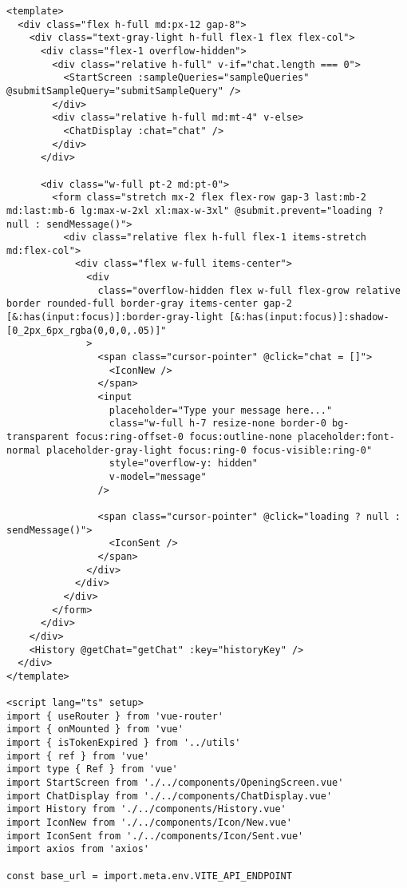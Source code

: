 \begin{Verbatim}[breaklines=true, breakanywhere=true]
<template>
  <div class="flex h-full md:px-12 gap-8">
    <div class="text-gray-light h-full flex-1 flex flex-col">
      <div class="flex-1 overflow-hidden">
        <div class="relative h-full" v-if="chat.length === 0">
          <StartScreen :sampleQueries="sampleQueries" @submitSampleQuery="submitSampleQuery" />
        </div>
        <div class="relative h-full md:mt-4" v-else>
          <ChatDisplay :chat="chat" />
        </div>
      </div>

      <div class="w-full pt-2 md:pt-0">
        <form class="stretch mx-2 flex flex-row gap-3 last:mb-2 md:last:mb-6 lg:max-w-2xl xl:max-w-3xl" @submit.prevent="loading ? null : sendMessage()">
          <div class="relative flex h-full flex-1 items-stretch md:flex-col">
            <div class="flex w-full items-center">
              <div
                class="overflow-hidden flex w-full flex-grow relative border rounded-full border-gray items-center gap-2 [&:has(input:focus)]:border-gray-light [&:has(input:focus)]:shadow-[0_2px_6px_rgba(0,0,0,.05)]"
              >
                <span class="cursor-pointer" @click="chat = []">
                  <IconNew />
                </span>
                <input
                  placeholder="Type your message here..."
                  class="w-full h-7 resize-none border-0 bg-transparent focus:ring-offset-0 focus:outline-none placeholder:font-normal placeholder-gray-light focus:ring-0 focus-visible:ring-0"
                  style="overflow-y: hidden"
                  v-model="message"
                />

                <span class="cursor-pointer" @click="loading ? null : sendMessage()">
                  <IconSent />
                </span>
              </div>
            </div>
          </div>
        </form>
      </div>
    </div>
    <History @getChat="getChat" :key="historyKey" />
  </div>
</template>

<script lang="ts" setup>
import { useRouter } from 'vue-router'
import { onMounted } from 'vue'
import { isTokenExpired } from '../utils'
import { ref } from 'vue'
import type { Ref } from 'vue'
import StartScreen from './../components/OpeningScreen.vue'
import ChatDisplay from './../components/ChatDisplay.vue'
import History from './../components/History.vue'
import IconNew from './../components/Icon/New.vue'
import IconSent from './../components/Icon/Sent.vue'
import axios from 'axios'

const base_url = import.meta.env.VITE_API_ENDPOINT


\end{Verbatim}
